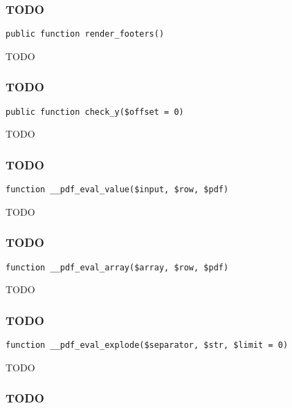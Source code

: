 \documentclass[a4paper]{article}
\begin{document}
\hypertarget{toc508}{}
\subsubsection{TODO}

\begin{lstlisting}
public function render_footers()
\end{lstlisting}

TODO

\hypertarget{toc509}{}
\subsubsection{TODO}

\begin{lstlisting}
public function check_y($offset = 0)
\end{lstlisting}

TODO

\hypertarget{toc510}{}
\subsubsection{TODO}

\begin{lstlisting}
function __pdf_eval_value($input, $row, $pdf)
\end{lstlisting}

TODO

\hypertarget{toc511}{}
\subsubsection{TODO}

\begin{lstlisting}
function __pdf_eval_array($array, $row, $pdf)
\end{lstlisting}

TODO

\hypertarget{toc512}{}
\subsubsection{TODO}

\begin{lstlisting}
function __pdf_eval_explode($separator, $str, $limit = 0)
\end{lstlisting}

TODO

\hypertarget{toc513}{}
\subsubsection{TODO}
\end{document}
